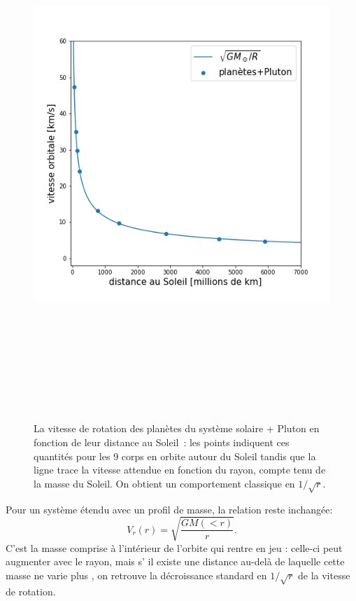 \begin{figure}[htbp]
	\centering
		\includegraphics[height=20cm]{figs/sysol.png}
	\caption[La vitesse de rotation des planètes du système solaire]{La vitesse de rotation des planètes du système solaire + Pluton en fonction de leur distance au Soleil~: les points indiquent ces quantités pour les 9 corps en orbite autour du Soleil tandis que la ligne trace la vitesse attendue en fonction du rayon, compte tenu de la masse du Soleil. On obtient un comportement classique en $1/\sqrt{r}$.} 
	\label{f:sysol}
\end{figure}


Pour un système étendu avec un profil de masse, la relation reste inchangée:
\begin{equation}
V_r(r)=\sqrt{\frac{GM(<r)}{r}}.
\end{equation}
C'est la masse comprise à l'intérieur de l'orbite qui rentre en jeu : celle-ci peut augmenter avec le rayon, mais s’ il existe une distance au-delà de laquelle cette masse ne varie plus , on retrouve la décroissance standard en $1/\sqrt{r}$ de la vitesse de rotation.

